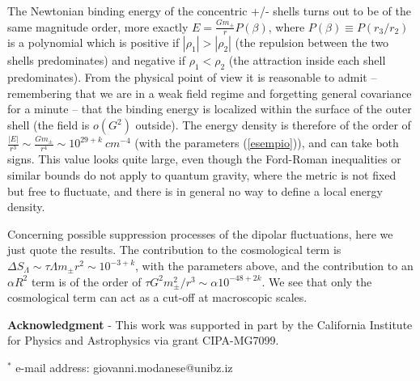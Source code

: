 \documentclass[a4paper,11pt]{article}
\begin{document}
The Newtonian binding energy of the concentric +/- shells
turns out to be of the same magnitude order, more exactly
$E = \frac{Gm_\pm}{r} P(\beta)$,
where $P(\beta) \equiv P(r_3/r_2)$ is a polynomial which 
is positive
if $|\rho_1|>|\rho_2|$ (the repulsion between the two shells
predominates) and negative if $\rho_1<\rho_2$ (the 
attraction inside each shell predominates).
From the physical point of view it is reasonable
to admit -- remembering that we are in a weak field regime
and forgetting general covariance for a minute -- that
the binding energy is localized within the surface of
the outer shell (the field is $o(G^2)$ outside). The
energy density is therefore of the order of
$\frac{|E|}{r^3} \sim \frac{Gm_\pm}{r^4} \sim 10^{29+k} \ 
cm^{-4}$ (with the parameters (\ref{esempio})), and can take both
signs. This value looks quite large, even though the
Ford-Roman inequalities \cite{for} or similar bounds do
not apply to quantum gravity, where the metric is not 
fixed but free to fluctuate, and there is in general no 
way to define a local energy density.

Concerning possible suppression processes of the
dipolar fluctuations, here we just
quote the results. The contribution to the cosmological
term is $\Delta S_{\Lambda} \sim \tau \Lambda m_\pm r^2
\sim 10^{-3+k}$, with the parameters above, and the
contribution to an $\alpha R^2$ term is of the order
of $\tau G^2 m_\pm^2/r^3 \sim \alpha 10^{-48+2k}$. We see
that only the cosmological term can act as a cut-off at
macroscopic scales.


\medskip
{\bf Acknowledgment} - This work was supported in part by the California Institute for Physics
and Astrophysics via grant CIPA-MG7099.

\medskip
\noindent $^*$ e-mail address: giovanni.modanese@unibz.iz
\end{document}
